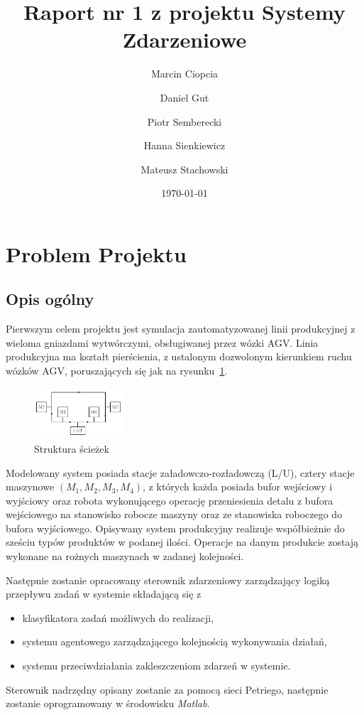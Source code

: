 \documentclass[10pt, a4paper]{article}
\author{Marcin Ciopcia \and Daniel Gut \and Piotr Semberecki \and Hanna Sienkiewicz \and Mateusz Stachowski
}
\title{Raport nr 1 z projektu Systemy Zdarzeniowe}
\date{\today}
\begin{document}
\maketitle



\section{Problem Projektu}
\label{sec:wstep}
%
\subsection{Opis ogólny}
Pierwszym celem projektu jest symulacja zautomatyzowanej linii produkcyjnej z wieloma gniazdami wytwórczymi, obsługiwanej przez wózki AGV. Linia produkcyjna ma kształt pierścienia, z ustalonym dozwolonym kierunkiem ruchu wózków AGV, poruszających się jak na rysunku~\ref{fig:sch}.
 \begin{figure}[htbp]
  \begin{center}
    \includegraphics[width=0.3\textwidth]{./obrazki/Schemat.png}
    \caption{Struktura ścieżek}
    \label{fig:sch}
  \end{center}
 \end{figure}
Modelowany system posiada stacje załadowczo-rozładowczą (L/U), cztery stacje  maszynowe $(M_1,M_2,M_3,M_4)$, z których każda posiada bufor wejściowy i wyjściowy oraz robota wykonującego operację przeniesienia detalu z bufora wejściowego na stanowisko robocze maszyny oraz ze stanowiska roboczego do bufora wyjściowego. Opisywany system produkcyjny realizuje współbieżnie do sześciu typów produktów w podanej ilości. Operacje na danym produkcie zostają wykonane na rożnych maszynach w zadanej kolejności.
 
 
Następnie zostanie opracowany sterownik zdarzeniowy zarządzający logiką przepływu zadań w systemie składającą się z
\begin{itemize}
\item klasyfikatora zadań możliwych do realizacji,
\item systemu agentowego zarządzającego kolejnością wykonywania działań,
\item systemu przeciwdziałania zakleszczeniom zdarzeń w systemie.
\end{itemize}
Sterownik nadrzędny opisany zostanie za pomocą sieci Petriego, następnie zostanie oprogramowany w środowisku \textit{Matlab}.
\end{document}

